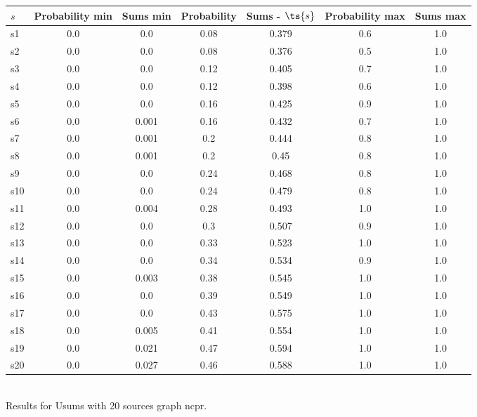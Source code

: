 \documentclass{article}
\begin{document}
\noindent\begin{tabular}{|l|c|c|c|c|c|c|}
\hline
$s$& Probability min & Sums min & Probability & Sums - $\ts{s}$ & Probability max & Sums max\\
\hline
s1 &0.0 & 0.0 & 0.08 & 0.379 & 0.6 & 1.0\\
\hline
s2 &0.0 & 0.0 & 0.08 & 0.376 & 0.5 & 1.0\\
\hline
s3 &0.0 & 0.0 & 0.12 & 0.405 & 0.7 & 1.0\\
\hline
s4 &0.0 & 0.0 & 0.12 & 0.398 & 0.6 & 1.0\\
\hline
s5 &0.0 & 0.0 & 0.16 & 0.425 & 0.9 & 1.0\\
\hline
s6 &0.0 & 0.001 & 0.16 & 0.432 & 0.7 & 1.0\\
\hline
s7 &0.0 & 0.001 & 0.2 & 0.444 & 0.8 & 1.0\\
\hline
s8 &0.0 & 0.001 & 0.2 & 0.45 & 0.8 & 1.0\\
\hline
s9 &0.0 & 0.0 & 0.24 & 0.468 & 0.8 & 1.0\\
\hline
s10 &0.0 & 0.0 & 0.24 & 0.479 & 0.8 & 1.0\\
\hline
s11 &0.0 & 0.004 & 0.28 & 0.493 & 1.0 & 1.0\\
\hline
s12 &0.0 & 0.0 & 0.3 & 0.507 & 0.9 & 1.0\\
\hline
s13 &0.0 & 0.0 & 0.33 & 0.523 & 1.0 & 1.0\\
\hline
s14 &0.0 & 0.0 & 0.34 & 0.534 & 0.9 & 1.0\\
\hline
s15 &0.0 & 0.003 & 0.38 & 0.545 & 1.0 & 1.0\\
\hline
s16 &0.0 & 0.0 & 0.39 & 0.549 & 1.0 & 1.0\\
\hline
s17 &0.0 & 0.0 & 0.43 & 0.575 & 1.0 & 1.0\\
\hline
s18 &0.0 & 0.005 & 0.41 & 0.554 & 1.0 & 1.0\\
\hline
s19 &0.0 & 0.021 & 0.47 & 0.594 & 1.0 & 1.0\\
\hline
s20 &0.0 & 0.027 & 0.46 & 0.588 & 1.0 & 1.0\\
\hline
\end{tabular}\\

\noindent Results for Usums with 20 sources graph ncpr.
\end{document}
